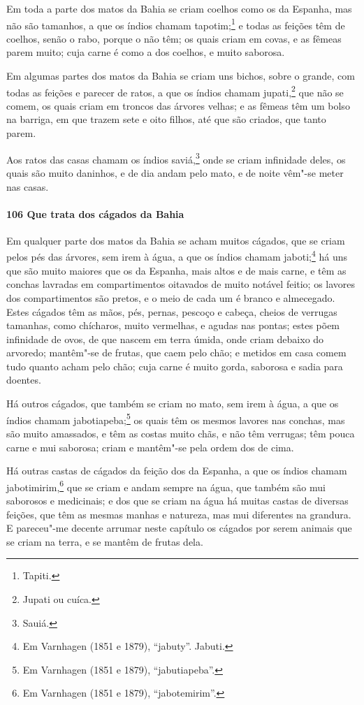 \begin{linenumbers}
Em toda a parte dos matos da Bahia se criam coelhos como os da Espanha, mas não são
tamanhos, a que os índios chamam tapotim;\footnote{ Tapiti.} e todas as feições têm de
coelhos, senão o rabo, porque o não têm; os quais criam em covas, e as fêmeas parem muito;
cuja carne é como a dos coelhos, e muito saborosa.

Em algumas partes dos matos da Bahia se criam uns bichos, sobre o grande, com todas as
feições e parecer de ratos, a que os índios chamam jupati,\footnote{ Jupati ou cuíca.} que
não se comem, os quais criam em troncos das árvores velhas; e as fêmeas têm um bolso na
barriga, em que trazem sete e oito filhos, até que são criados, que tanto parem.

Aos ratos das casas chamam os índios saviá,\footnote{ Sauiá.} onde se criam infinidade
deles, os quais são muito daninhos, e de dia andam pelo mato, e de noite vêm"-se meter nas
casas.

\paragraph{106 Que trata dos cágados da Bahia}\quad
Em qualquer parte dos matos da Bahia se acham muitos cágados, que se criam pelos pés das
árvores, sem irem à água, a que os índios chamam jaboti;\footnote{ Em Varnhagen (1851 e
1879), ``jabuty''. Jabuti.} há uns que são muito maiores que os da Espanha, mais altos e
de mais carne, e têm as conchas lavradas em compartimentos oitavados de muito notável
feitio; os lavores dos compartimentos são pretos, e o meio de cada um é branco e
almecegado. Estes cágados têm as mãos, pés, pernas, pescoço e cabeça, cheios de verrugas
tamanhas, como chícharos, muito vermelhas, e agudas nas pontas; estes põem infinidade de
ovos, de que nascem em terra úmida, onde criam debaixo do arvoredo; mantêm"-se de frutas,
que caem pelo chão; e metidos em casa comem tudo quanto acham pelo chão; cuja carne é
muito gorda, saborosa e sadia para doentes.

Há outros cágados, que também se criam no mato, sem irem à água, a que os índios chamam
jabotiapeba;\footnote{ Em Varnhagen (1851 e 1879), ``jabutiapeba''.} os quais têm os
mesmos lavores nas conchas, mas são muito amassados, e têm as costas muito chãs, e não têm
verrugas; têm pouca carne e mui saborosa; criam e mantêm"-se pela ordem dos de cima.

Há outras castas de cágados da feição dos da Espanha, a que os índios chamam
jabotimirim,\footnote{ Em Varnhagen (1851 e 1879), ``jabotemirim''.} que se criam e andam
sempre na água, que também são mui saborosos e medicinais; e dos que se criam na água há
muitas castas de diversas feições, que têm as mesmas manhas e natureza, mas mui diferentes
na grandura. E pareceu"-me decente arrumar neste capítulo os cágados por serem animais que
se criam na terra, e se mantêm de frutas dela.


\end{linenumbers}
